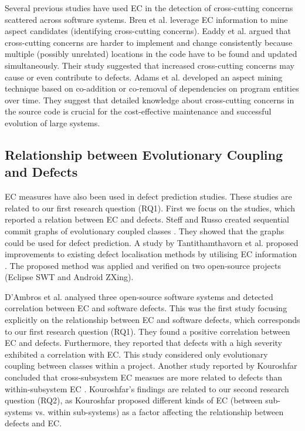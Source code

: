 \documentclass[times]{smrauth}
\begin{document}
Several previous studies have used EC in the detection of cross-cutting concerns scattered across software systems. Breu et al. \cite{breu2006mining} leverage EC information to mine aspect candidates (identifying cross-cutting concerns). Eaddy et al. \cite{eaddy2008crosscutting} argued that cross-cutting concerns are harder to implement and change consistently because multiple (possibly unrelated) locations in the code have to be found and updated simultaneously. Their study suggested that increased cross-cutting concerns may cause or even contribute to defects. Adams et al. \cite{Adams:2010:ICC:1806799.1806846} developed an aspect mining technique based on co-addition or co-removal of dependencies on program entities over time. They suggest that detailed knowledge about cross-cutting concerns in the source code is crucial for the cost-effective maintenance and successful evolution of large systems. 

\subsection{Relationship between Evolutionary Coupling and Defects}

EC measures have also been used in defect prediction studies. These studies are related to our first research question (RQ1). First we focus on the studies, which reported a relation between EC and defects. Steff and Russo created sequential commit graphs of evolutionary coupled classes \cite{steff2012co}. They showed that the graphs could be used for defect prediction. A study by Tantithamthavorn et al. proposed improvements to existing  defect localisation methods by utilising EC information \cite{tantithamthavorn2013using}. The proposed method was applied and verified on two open-source projects (Eclipse SWT and Android ZXing).

D'Ambros et al. \cite{d2009relationship} analysed three open-source software systems and detected correlation between EC and software defects. This was the first study focusing explicitly on the relationship between EC and software defects, which corresponds to our first research question (RQ1). They found a positive correlation between EC and defects. Furthermore, they reported that defects with a high severity exhibited a correlation with EC. This study considered only evolutionary coupling between classes within a project. Another study reported by Kouroshfar concluded that cross-subsystem EC measues are more related to defects than within-subsystem EC \cite{kouroshfar2013studying}. Kouroshfar's findings are related to our second research question (RQ2), as Kouroshfar proposed different kinds of EC (between sub-systems vs. within sub-systems) as a factor affecting the relationship between defects and EC.
\end{document}
